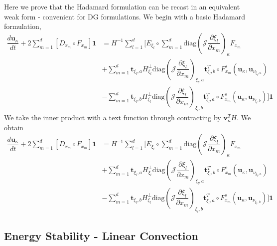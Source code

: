 \documentclass[12pt,a4paper]{article}
\newcommand{\pder}[2][]{\dfrac{\partial #1}{\partial #2}} %
\newcommand{\der}[2][]{\dfrac{d #1}{d #2}} %
\newcommand{\fn}[1]{\mathcal{#1}} %
\begin{document}
Here we prove that the Hadamard formulation can be recast in an equivalent weak form - convenient for DG formulations. We begin with a basic Hadamard formulation,
\begin{align*}
\der[\bm{u}_\kappa]{t} + 2 \sum_{m=1}^d \left[ D_{x_m} \circ F_{x_m} \right] \bm{1}  
&= H^{-1} \sum_{l=1}^d \Bigg[ E_{\xi_l} \circ \sum_{m=1}^d \text{diag} \left( \fn{J} \pder[\xi_l]{x_m} \right)_{\kappa} F_{x_m} \\
&  + \sum_{m=1}^d \bm{t}_{\xi_l, a} H^{\bot}_{\xi_l} \text{diag} \left( \fn{J} \pder[\xi_l]{x_m} \right)_{\xi_l,a} \bm{t}_{\xi_l, b}^T \circ  F^s_{x_m} (\bm{u}_\kappa, \bm{u}_{\nu_{\xi_l,a}}) \\
& - \sum_{m=1}^d \bm{t}_{\xi_l, b} H^{\bot}_{\xi_l}  \text{diag} \left( \fn{J} \pder[\xi_l]{x_m} \right)_{\xi_l,b} \bm{t}_{\xi_l, a}^T \circ F^s_{x_m} (\bm{u}_\kappa, \bm{u}_{\nu_{\xi_l,b}})
\Bigg] \bm{1}
\end{align*}
We take the inner product with a text function through contracting by $\bm{v}_\kappa^T H$. We obtain
\begin{align*}
\der[\bm{u}_\kappa]{t} + 2 \sum_{m=1}^d \left[ D_{x_m} \circ F_{x_m} \right] \bm{1}  
&= H^{-1} \sum_{l=1}^d \Bigg[ E_{\xi_l} \circ \sum_{m=1}^d \text{diag} \left( \fn{J} \pder[\xi_l]{x_m} \right)_{\kappa} F_{x_m} \\
&  + \sum_{m=1}^d \bm{t}_{\xi_l, a} H^{\bot}_{\xi_l} \text{diag} \left( \fn{J} \pder[\xi_l]{x_m} \right)_{\xi_l,a} \bm{t}_{\xi_l, b}^T \circ  F^s_{x_m} (\bm{u}_\kappa, \bm{u}_{\nu_{\xi_l,a}}) \\
& - \sum_{m=1}^d \bm{t}_{\xi_l, b} H^{\bot}_{\xi_l}  \text{diag} \left( \fn{J} \pder[\xi_l]{x_m} \right)_{\xi_l,b} \bm{t}_{\xi_l, a}^T \circ F^s_{x_m} (\bm{u}_\kappa, \bm{u}_{\nu_{\xi_l,b}})
\Bigg] \bm{1}
\end{align*}

\subsection{Energy Stability - Linear Convection}
\end{document}
